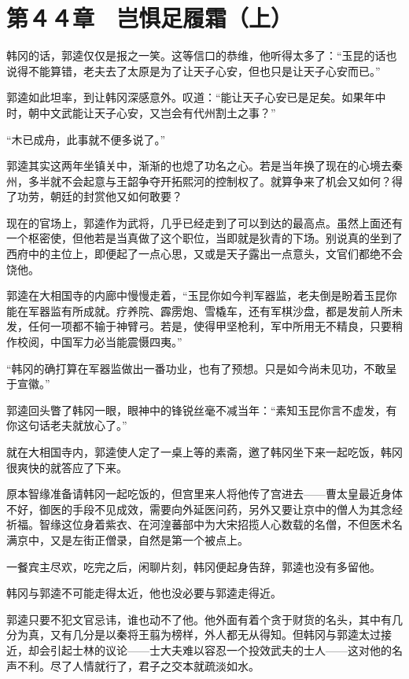 \section{第４４章　岂惧足履霜（上）}

韩冈的话，郭逵仅仅是报之一笑。这等信口的恭维，他听得太多了：“玉昆的话也说得不能算错，老夫去了太原是为了让天子心安，但也只是让天子心安而已。”

郭逵如此坦率，到让韩冈深感意外。叹道：“能让天子心安已是足矣。如果年中时，朝中文武能让天子心安，又岂会有代州割土之事？”

“木已成舟，此事就不便多说了。”

郭逵其实这两年坐镇关中，渐渐的也熄了功名之心。若是当年换了现在的心境去秦州，多半就不会起意与王韶争夺开拓熙河的控制权了。就算争来了机会又如何？得了功劳，朝廷的封赏他又如何敢要？

现在的官场上，郭逵作为武将，几乎已经走到了可以到达的最高点。虽然上面还有一个枢密使，但他若是当真做了这个职位，当即就是狄青的下场。别说真的坐到了西府中的主位上，即便起了一点心思，又或是天子露出一点意头，文官们都绝不会饶他。

郭逵在大相国寺的内廊中慢慢走着，“玉昆你如今判军器监，老夫倒是盼着玉昆你能在军器监有所成就。疗养院、霹雳炮、雪橇车，还有军棋沙盘，都是发前人所未发，任何一项都不输于神臂弓。若是，使得甲坚枪利，军中所用无不精良，只要稍作校阅，中国军力必当能震慑四夷。”

“韩冈的确打算在军器监做出一番功业，也有了预想。只是如今尚未见功，不敢呈于宣徽。”

郭逵回头瞥了韩冈一眼，眼神中的锋锐丝毫不减当年：“素知玉昆你言不虚发，有你这句话老夫就放心了。”

就在大相国寺内，郭逵使人定了一桌上等的素斋，邀了韩冈坐下来一起吃饭，韩冈很爽快的就答应了下来。

原本智缘准备请韩冈一起吃饭的，但宫里来人将他传了宫进去——曹太皇最近身体不好，御医的手段不见成效，需要向外延医问药，另外又要让京中的僧人为其念经祈福。智缘这位身着紫衣、在河湟蕃部中为大宋招揽人心数载的名僧，不但医术名满京中，又是左街正僧录，自然是第一个被点上。

一餐宾主尽欢，吃完之后，闲聊片刻，韩冈便起身告辞，郭逵也没有多留他。

韩冈与郭逵不可能走得太近，他也没必要与郭逵走得近。

郭逵只要不犯文官忌讳，谁也动不了他。他外面有着个贪于财货的名头，其中有几分为真，又有几分是以秦将王翦为榜样，外人都无从得知。但韩冈与郭逵太过接近，却会引起士林的议论——士大夫难以容忍一个投效武夫的士人——这对他的名声不利。尽了人情就行了，君子之交本就疏淡如水。

